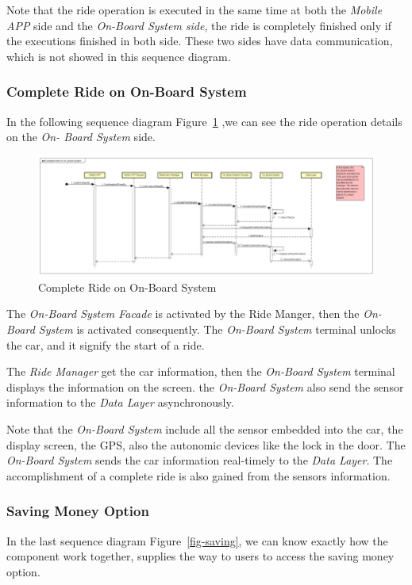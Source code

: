 \documentclass[a4paper,11pt]{article}
\begin{document}
Note that the ride operation is executed in the same time at both the \textsl{Mobile APP} side and the \textsl{On-Board System side}, the ride is completely finished only if the executions finished in both side. These two sides have data communication, which is not showed in this sequence diagram.	

		\subsubsection{Complete Ride on On-Board System}		
In the following sequence diagram Figure~\ref{fig-completebod} ,we can see the ride operation details on the \textsl{On- Board System} side.	

		\begin{figure}[H]
   			\centering
   			\includegraphics[width=\textwidth]{images/complet_onboard}
  	    		\caption{Complete Ride on On-Board System}\label{fig-completebod}
		\end{figure}
		
The \textsl{On-Board System Facade} is activated by the Ride Manger, then the \textsl{On-Board System} is activated consequently. The \textsl{On-Board System} terminal unlocks the car, and it signify the start of a ride.

The \textsl{Ride Manager} get the car information, then the \textsl{On-Board System} terminal displays the information on the screen. the \textsl{On-Board System} also send the sensor information to the \textsl{Data Layer} asynchronously.

Note that the \textsl{On-Board System} include all the sensor embedded into the car, the display screen, the GPS, also the autonomic devices like the lock in the door. The \textsl{On-Board System} sends the car information real-timely to the \textsl{Data Layer}. The accomplishment of a complete ride is also gained from the sensors information.

		\subsubsection{Saving Money Option}
In the last sequence diagram Figure~\ref{fig-saving}, we can know exactly how the component work together, supplies the way to users to access the saving money option.
		
\end{document}
